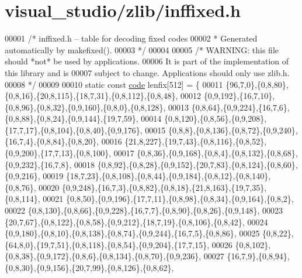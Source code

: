 \hypertarget{visual__studio_2zlib_2inffixed_8h_source}{}\section{visual\+\_\+studio/zlib/inffixed.h}
\label{visual__studio_2zlib_2inffixed_8h_source}

\begin{DoxyCode}
00001     \textcolor{comment}{/* inffixed.h -- table for decoding fixed codes}
00002 \textcolor{comment}{     * Generated automatically by makefixed().}
00003 \textcolor{comment}{     */}
00004 
00005     \textcolor{comment}{/* WARNING: this file should *not* be used by applications.}
00006 \textcolor{comment}{       It is part of the implementation of this library and is}
00007 \textcolor{comment}{       subject to change. Applications should only use zlib.h.}
00008 \textcolor{comment}{     */}
00009 
00010     \textcolor{keyword}{static} \textcolor{keyword}{const} \hyperlink{structcode}{code} lenfix[512] = \{
00011         \{96,7,0\},\{0,8,80\},\{0,8,16\},\{20,8,115\},\{18,7,31\},\{0,8,112\},\{0,8,48\},
00012         \{0,9,192\},\{16,7,10\},\{0,8,96\},\{0,8,32\},\{0,9,160\},\{0,8,0\},\{0,8,128\},
00013         \{0,8,64\},\{0,9,224\},\{16,7,6\},\{0,8,88\},\{0,8,24\},\{0,9,144\},\{19,7,59\},
00014         \{0,8,120\},\{0,8,56\},\{0,9,208\},\{17,7,17\},\{0,8,104\},\{0,8,40\},\{0,9,176\},
00015         \{0,8,8\},\{0,8,136\},\{0,8,72\},\{0,9,240\},\{16,7,4\},\{0,8,84\},\{0,8,20\},
00016         \{21,8,227\},\{19,7,43\},\{0,8,116\},\{0,8,52\},\{0,9,200\},\{17,7,13\},\{0,8,100\},
00017         \{0,8,36\},\{0,9,168\},\{0,8,4\},\{0,8,132\},\{0,8,68\},\{0,9,232\},\{16,7,8\},
00018         \{0,8,92\},\{0,8,28\},\{0,9,152\},\{20,7,83\},\{0,8,124\},\{0,8,60\},\{0,9,216\},
00019         \{18,7,23\},\{0,8,108\},\{0,8,44\},\{0,9,184\},\{0,8,12\},\{0,8,140\},\{0,8,76\},
00020         \{0,9,248\},\{16,7,3\},\{0,8,82\},\{0,8,18\},\{21,8,163\},\{19,7,35\},\{0,8,114\},
00021         \{0,8,50\},\{0,9,196\},\{17,7,11\},\{0,8,98\},\{0,8,34\},\{0,9,164\},\{0,8,2\},
00022         \{0,8,130\},\{0,8,66\},\{0,9,228\},\{16,7,7\},\{0,8,90\},\{0,8,26\},\{0,9,148\},
00023         \{20,7,67\},\{0,8,122\},\{0,8,58\},\{0,9,212\},\{18,7,19\},\{0,8,106\},\{0,8,42\},
00024         \{0,9,180\},\{0,8,10\},\{0,8,138\},\{0,8,74\},\{0,9,244\},\{16,7,5\},\{0,8,86\},
00025         \{0,8,22\},\{64,8,0\},\{19,7,51\},\{0,8,118\},\{0,8,54\},\{0,9,204\},\{17,7,15\},
00026         \{0,8,102\},\{0,8,38\},\{0,9,172\},\{0,8,6\},\{0,8,134\},\{0,8,70\},\{0,9,236\},
00027         \{16,7,9\},\{0,8,94\},\{0,8,30\},\{0,9,156\},\{20,7,99\},\{0,8,126\},\{0,8,62\},

\end{DoxyCode}
